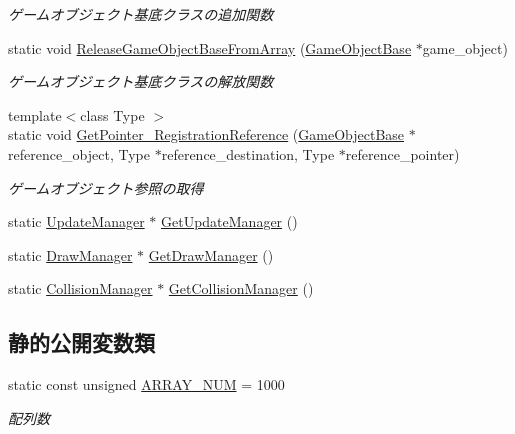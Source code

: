 \begin{DoxyCompactItemize}
\begin{DoxyCompactList}\small\item\em ゲームオブジェクト基底クラスの追加関数 \end{DoxyCompactList}\item 
static void \mbox{\hyperlink{class_game_object_manager_a83342c1c358e32f6478ae3428fcb25fa}{Release\+Game\+Object\+Base\+From\+Array}} (\mbox{\hyperlink{class_game_object_base}{Game\+Object\+Base}} $\ast$game\+\_\+object)
\begin{DoxyCompactList}\small\item\em ゲームオブジェクト基底クラスの解放関数 \end{DoxyCompactList}\item 
{\footnotesize template$<$class Type $>$ }\\static void \mbox{\hyperlink{class_game_object_manager_a4b905d160c31b234686a3d46c0743adb}{Get\+Pointer\+\_\+\+Registration\+Reference}} (\mbox{\hyperlink{class_game_object_base}{Game\+Object\+Base}} $\ast$reference\+\_\+object, Type $\ast$reference\+\_\+destination, Type $\ast$reference\+\_\+pointer)
\begin{DoxyCompactList}\small\item\em ゲームオブジェクト参照の取得 \end{DoxyCompactList}\item 
static \mbox{\hyperlink{class_update_manager}{Update\+Manager}} $\ast$ \mbox{\hyperlink{class_game_object_manager_a7d34b53f99cc2264ab6a8c253392a865}{Get\+Update\+Manager}} ()
\item 
static \mbox{\hyperlink{class_draw_manager}{Draw\+Manager}} $\ast$ \mbox{\hyperlink{class_game_object_manager_a862e76bfd74495c20bddd377c62a22b7}{Get\+Draw\+Manager}} ()
\item 
static \mbox{\hyperlink{class_collision_manager}{Collision\+Manager}} $\ast$ \mbox{\hyperlink{class_game_object_manager_a41775a8308691a84b468a0aeeb1b3376}{Get\+Collision\+Manager}} ()
\end{DoxyCompactItemize}
\subsection*{静的公開変数類}
\begin{DoxyCompactItemize}
\item 
static const unsigned \mbox{\hyperlink{class_game_object_manager_a591934d64d750c10c03c908371470681}{A\+R\+R\+A\+Y\+\_\+\+N\+UM}} = 1000
\begin{DoxyCompactList}\small\item\em 配列数 \end{DoxyCompactList}\end{DoxyCompactItemize}
